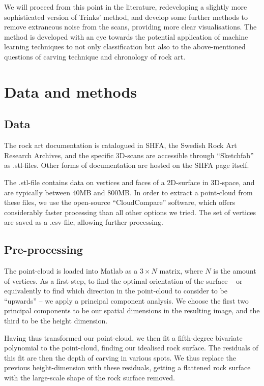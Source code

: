 \documentclass[a4paper,reqno,oneside]{amsart} %
\theoremstyle{definition}
\theoremstyle{remark}
\numberwithin{equation}{section}
\begin{document}
We will proceed from this point in the literature, redeveloping a slightly more sophisticated version of Trinks' method, and develop some further methods to remove extraneous noise from the scans, providing more clear visualisations. The method is developed with an eye towards the potential application of machine learning techniques to not only classification but also to the above-mentioned questions of carving technique and chronology of rock art.

\section{Data and methods}
\subsection{Data}
The rock art documentation is catalogued in SHFA, the Swedish Rock Art Research Archives\cite{shfa}, and the specific 3D-scans are accessible through ``Sketchfab''\cite{sketchfab} as .stl-files. Other forms of documentation are hosted on the SHFA page itself.

The .stl-file contains data on vertices and faces of a 2D-surface in 3D-space, and are typically between 40MB and 800MB. In order to extract a point-cloud from these files, we use the open-source ``CloudCompare'' software\cite{cloudcompare}, which offers considerably faster processing than all other options we tried. The set of vertices are saved as a .csv-file, allowing further processing.

\subsection{Pre-processing}
The point-cloud is loaded into Matlab as a $3\times N$ matrix, where $N$ is the amount of vertices. As a first step, to find the optimal orientation of the surface -- or equivalently to find which direction in the point-cloud to consider to be ``upwards'' -- we apply a principal component analysis. We choose the first two principal components to be our spatial dimensions in the resulting image, and the third to be the height dimension.

Having thus transformed our point-cloud, we then fit a fifth-degree bivariate polynomial to the point-cloud, finding our idealised rock surface. The residuals of this fit are then the depth of carving in various spots. We thus replace the previous height-dimension with these residuals, getting a flattened rock surface with the large-scale shape of the rock surface removed.
\end{document}
